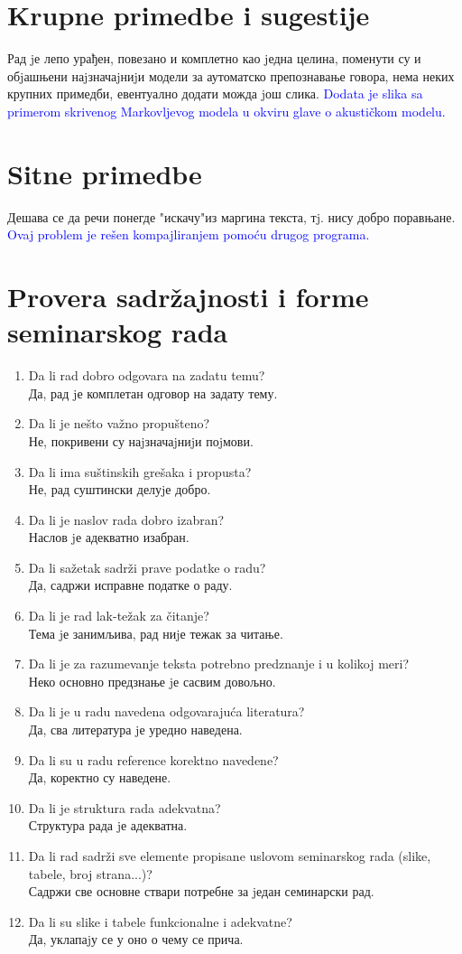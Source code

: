 \documentclass[a4paper]{report}
\newcommand{\odgovor}[1]{\textcolor{blue}{#1}}
\begin{document}
\section{Krupne primedbe i sugestije}
Рад jе лепо урађен, повезано и комплетно као jедна целина, поменути су и обjашњени наjзначаjниjи модели за аутоматско препознавање говора, нема неких крупних примедби, евентуално додати можда jош слика.
\odgovor{Dodata je slika sa primerom skrivenog Markovljevog modela u okviru glave o akustičkom modelu.}

\section{Sitne primedbe}
Дешава се да речи понегде "искачу"из маргина текста, тj. нису добро поравњане.
\odgovor{Ovaj problem je rešen kompajliranjem pomoću drugog programa.}

\section{Provera sadržajnosti i forme seminarskog rada}
\begin{enumerate}
\item Da li rad dobro odgovara na zadatu temu?\\
Да, рад jе комплетан одговор на задату тему.
\item Da li je nešto važno propušteno?\\
Не, покривени су наjзначаjниjи поjмови.
\item Da li ima suštinskih grešaka i propusta?\\
Не, рад суштински делуjе добро.
\item Da li je naslov rada dobro izabran?\\
Наслов jе адекватно изабран.
\item Da li sažetak sadrži prave podatke o radu?\\
Да, садржи исправне податке о раду.
\item Da li je rad lak-težak za čitanje?\\
Тема jе занимљива, рад ниjе тежак за читање.
\item Da li je za razumevanje teksta potrebno predznanje i u kolikoj meri?\\
Неко основно предзнање jе сасвим довољно.
\item Da li je u radu navedena odgovarajuća literatura?\\
Да, сва литература jе уредно наведена.
\item Da li su u radu reference korektno navedene?\\
Да, коректно су наведене.
\item Da li je struktura rada adekvatna?\\
Структура рада jе адекватна.
\item Da li rad sadrži sve elemente propisane uslovom seminarskog rada (slike, tabele, broj strana...)?\\
Садржи све основне ствари потребне за jедан семинарски рад.
\item Da li su slike i tabele funkcionalne i adekvatne?\\
Да, уклапаjу се у оно о чему се прича.
\end{enumerate}
\end{document}
